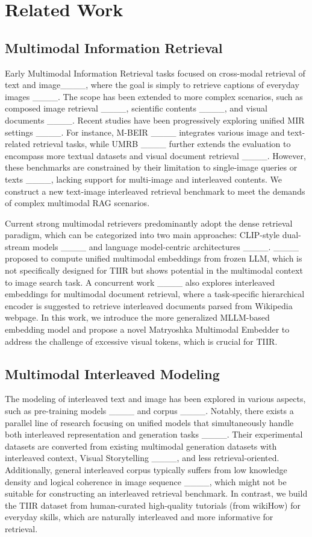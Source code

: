 \section{Related Work}
\subsection{Multimodal Information Retrieval}
Early Multimodal Information Retrieval tasks focused on cross-modal retrieval of text and image____, where the goal is simply to retrieve captions of everyday images ____.
The scope has been extended to more complex scenarios, such as composed image retrieval ____, scientific contents ____, and visual documents ____.
Recent studies have been progressively exploring unified MIR settings ____.
For instance, M-BEIR ____ integrates various image and text-related retrieval tasks, while UMRB ____ further extends the evaluation to encompass more textual datasets and visual document retrieval ____.
However, these benchmarks are constrained by their limitation to single-image queries or texts ____, lacking support for multi-image and interleaved contents.
We construct a new text-image interleaved retrieval benchmark to meet the demands of complex multimodal RAG scenarios.

Current strong multimodal retrievers predominantly adopt the dense retrieval paradigm, which can be categorized into two main approaches: CLIP-style dual-stream models ____ and language model-centric architectures ____.
____ proposed to compute unified multimodal embeddings from frozen LLM, which is not specifically designed for TIIR but shows potential in the multimodal context to image search task.
A concurrent work ____ also explores interleaved embeddings for multimodal document retrieval, where a task-specific hierarchical encoder is suggested to retrieve interleaved documents parsed from Wikipedia webpage.
In this work, we introduce the more generalized MLLM-based embedding model and propose a novel Matryoshka Multimodal Embedder to address the challenge of excessive visual tokens, which is crucial for TIIR.


\subsection{Multimodal Interleaved Modeling}
The modeling of interleaved text and image has been explored in various aspects, such as pre-training models ____ and corpus ____.
Notably, there exists a parallel line of research focusing on unified models that simultaneously handle both interleaved representation and generation tasks ____.
Their experimental datasets are converted from existing multimodal generation datasets with interleaved context, \eg Visual Storytelling ____, and less retrieval-oriented.
Additionally, general interleaved corpus typically suffers from low knowledge density and logical coherence in image
sequence ____, which might not be suitable for constructing an interleaved retrieval benchmark.
In contrast, we build the TIIR dataset from human-curated high-quality tutorials (from wikiHow) for everyday skills, which are naturally interleaved and more informative for retrieval.